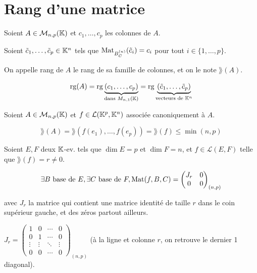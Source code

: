 \documentclass[12pt, a4paper]{report}
\begin{document}
\chapter{Rang d'une matrice}

\begin{definition}
    Soient $A \in \mathcal M_{n,p}(\mathbb{K})$ et $c_1,\dots,c_p$ les colonnes de $A$.

    Soient $\tilde c_1, \dots, \tilde c_p \in \mathbb{K}^n$ tels que $\mathrm{Mat}_{B_C^{(n)}}(\tilde c_i) = c_i$ pour tout $i \in \{1,\dots,p\}$.

    On appelle rang de $A$ le rang de sa famille de colonnes, et on le note $\rang(A)$.

    $$\mathrm{rg}(A) = \mathrm{rg}\underbrace{(c_1,\dots,c_p)}_{\text{dans } M_{n,1}(\mathbb{K})} = \mathrm{rg}\underbrace{(\tilde c_1, \dots, \tilde c_p)}_{\text{vecteurs de } \mathbb{K}^n}$$
\end{definition}

\begin{remark}
    Soient $A \in \mathcal M_{n,p}(\mathbb{K})$ et $f \in \mathcal L(\mathbb{K}^p, \mathbb{K}^n)$ associée canoniquement à $A$.

    $$\rang(A) = \rang(f(e_1), \dots, f(e_p)) = \rang(f) \le \min(n,p)$$
\end{remark}

\begin{property}
    Soient $E,F$ deux $\mathbb{K}$-ev. tels que $\dim E = p$ et $\dim F = n$, et $f \in \mathcal L(E,F)$ telle que $\rang(f) = r \ne 0$.

    $$\exists B \text{ base de } E, \exists C \text{ base de } F, \mathrm{Mat}(f,B,C) = \left(\begin{matrix} J_r & 0 \\ 0 & 0 \end{matrix}\right)_{(n,p)}$$

    avec $J_r$ la matrice qui contient une matrice identité de taille $r$ dans le coin supérieur gauche, et des zéros partout ailleurs.

    $J_r = \left(\begin{matrix} 1 & 0 & \cdots & 0 \\ 0 & 1 & \cdots & 0 \\ \vdots & \vdots & \ddots & \vdots \\ 0 & 0 & \cdots & 0 \end{matrix}\right)_{(n,p)}$ (à la ligne et colonne $r$, on retrouve le dernier 1 diagonal).
\end{property}
\end{document}
